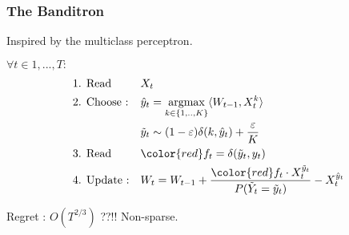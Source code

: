 \documentclass{beamer}
\begin{document}
\begin{frame}
	\frametitle{The Banditron \cite{kakade2008efficient}}
	\begin{small}
	Inspired by the multiclass perceptron.
	\begin{block}{}
		$\forall t \in 1,...,T :$
		\begin{align*}
		&\text{1. Read } 
		&& X_t 
		\\
		&\text{2. Choose :} 
		&& \hat{y}_t = \underset{k \in\{1,..,K\}}{\text{argmax}}  \langle W_{t-1}, X_t^k \rangle 
		\\
		& %
		&& \tilde{y}_t \sim (1-\varepsilon) \delta(k,\hat{y}_t) + \frac{\varepsilon}{K} 
		\\	
		&\text{3. Read } 
		&& {\color{red} f_t = \delta(\tilde{y}_t ,y_t)}  
		\\
		&\text{4. Update :} 
		&& W_t = W_{t-1} + \frac{{\color{red}f_t}\cdot X_t^{\tilde{y}_t}}{P(\tilde{Y}_t=\tilde{y}_t)} - X_t^{\hat{y}_t} 
		\end{align*}
	\end{block}
		Regret : $O(T^{2/3})$ ??!! Non-sparse.
	\end{small}

\end{frame}

\end{document}
